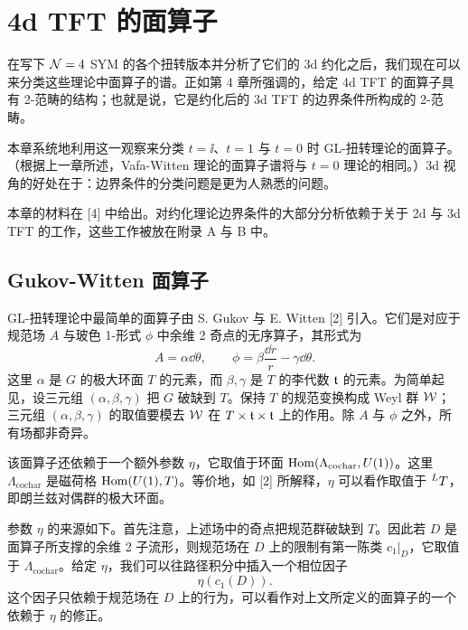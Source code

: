\chapter{4d TFT 的面算子}

在写下 $\mathcal{N}=4$ SYM 的各个扭转版本并分析了它们的 3d 约化之后，我们现在可以来分类这些理论中面算子的谱。正如第 4 章所强调的，给定 4d TFT 的面算子具有 2-范畴的结构；也就是说，它是约化后的 3d TFT 的边界条件所构成的 2-范畴。

本章系统地利用这一观察来分类 $t=\ii$、$t=1$ 与 $t=0$ 时 GL-扭转理论的面算子。（根据上一章所述，Vafa-Witten 理论的面算子谱将与 $t=0$ 理论的相同。）3d 视角的好处在于：边界条件的分类问题是更为人熟悉的问题。

本章的材料在 [4] 中给出。对约化理论边界条件的大部分分析依赖于关于 2d 与 3d TFT 的工作，这些工作被放在附录 A 与 B 中。

\section{Gukov-Witten 面算子}

GL-扭转理论中最简单的面算子由 S. Gukov 与 E. Witten [2] 引入。它们是对应于规范场 $A$ 与玻色 1-形式 $\phi$ 中余维 2 奇点的无序算子，其形式为
\[
A=\alpha\dd\theta,\qquad \phi=\beta\frac{\dd r}{r}-\gamma\dd\theta .
\]
这里 $\alpha$ 是 $G$ 的极大环面 $T$ 的元素，而 $\beta,\gamma$ 是 $T$ 的李代数 $\mathfrak{t}$ 的元素。为简单起见，设三元组 $(\alpha,\beta,\gamma)$ 把 $G$ 破缺到 $T$。保持 $T$ 的规范变换构成 Weyl 群 $\mathcal{W}$；三元组 $(\alpha,\beta,\gamma)$ 的取值要模去 $\mathcal{W}$ 在 $T\times\mathfrak{t}\times\mathfrak{t}$ 上的作用。除 $A$ 与 $\phi$ 之外，所有场都非奇异。

该面算子还依赖于一个额外参数 $\eta$，它取值于环面 $\operatorname{Hom}(\Lambda_{\mathrm{cochar}},U(1))$。这里 $\Lambda_{\mathrm{cochar}}$ 是磁荷格 $\operatorname{Hom}(U(1),T)$。等价地，如 [2] 所解释，$\eta$ 可以看作取值于 ${}^{L}T$，即朗兰兹对偶群的极大环面。


参数 $\eta$ 的来源如下。首先注意，上述场中的奇点把规范群破缺到 $T$。因此若 $D$ 是面算子所支撑的余维 2 子流形，则规范场在 $D$ 上的限制有第一陈类 $c_1|_D$，它取值于 $\Lambda_{\mathrm{cochar}}$。给定 $\eta$，我们可以往路径积分中插入一个相位因子
\[
\eta(c_1(D)).
\]
这个因子只依赖于规范场在 $D$ 上的行为，可以看作对上文所定义的面算子的一个依赖于 $\eta$ 的修正。

